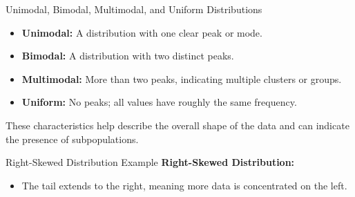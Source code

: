 \documentclass[handout]{beamer} %
\begin{document}
\begin{frame}{Unimodal, Bimodal, Multimodal, and Uniform Distributions}
    \begin{itemize}
        \item \textbf{Unimodal:} A distribution with one clear peak or mode.
        \item \textbf{Bimodal:} A distribution with two distinct peaks.
        \item \textbf{Multimodal:} More than two peaks, indicating multiple clusters or groups.
        \item \textbf{Uniform:} No peaks; all values have roughly the same frequency.
    \end{itemize}
    \vspace{0.5cm}
    These characteristics help describe the overall shape of the data and can indicate the presence of subpopulations.
\end{frame}

\begin{frame}{Right-Skewed Distribution Example}
    \textbf{Right-Skewed Distribution:}
    \begin{itemize}
        \item The tail extends to the right, meaning more data is concentrated on the left.
    \end{itemize}

    \begin{center}
    \end{center}
\end{frame}
\end{document}
